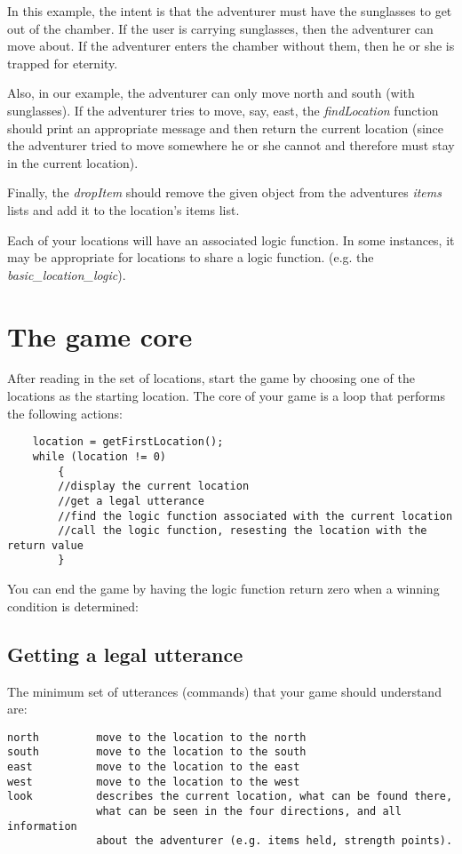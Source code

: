 \documentclass[12pt]{article}
\begin{document}
In this example, the intent is that the adventurer must have the
sunglasses to get out of the chamber. If the user is carrying sunglasses,
then the adventurer can move about. If the adventurer enters the
chamber without them, then he or she is trapped for eternity.

Also, in our example, the adventurer can only move north and south
(with sunglasses). If the adventurer tries to move, say, east,
the {\it findLocation} function should print an appropriate message and
then return the current location (since the adventurer tried to move
somewhere he or she cannot and therefore must stay in the current location).

Finally, the {\it dropItem} should remove the given object from the
adventures {\it items} lists and add it to the location's items list.

Each of your locations will have an associated logic function. In some
instances, it may be appropriate for locations to share a logic function.
(e.g. the {\it basic\_location\_logic}).

\section*{The game core}

After reading in the set of locations,
start the game by choosing one of the locations as the starting location.
The core of your game is a loop that performs the following actions:

\begin{verbatim}
    location = getFirstLocation();
    while (location != 0)
        {
        //display the current location
        //get a legal utterance
        //find the logic function associated with the current location
        //call the logic function, resesting the location with the return value
        }
\end{verbatim}

You can end the game by having the logic function return zero when a
winning condition is determined:

\subsection*{Getting a legal utterance}

The minimum set of utterances (commands) that your game should understand are:

\begin{verbatim}
north         move to the location to the north
south         move to the location to the south
east          move to the location to the east
west          move to the location to the west
look          describes the current location, what can be found there,
              what can be seen in the four directions, and all information
              about the adventurer (e.g. items held, strength points).
\end{verbatim}
\end{document}
